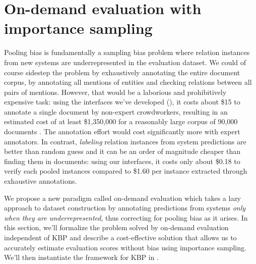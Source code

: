 \section{On-demand evaluation with importance sampling}
\label{sec:method}

Pooling bias is fundamentally a sampling bias problem where relation instances from new systems are underrepresented in the evaluation dataset.
We could of course sidestep the problem by exhaustively annotating the entire document corpus, by annotating all mentions of entities and checking relations between all pairs of mentions. However, that would be a laborious and prohibitively expensive task:
using the interfaces we've developed (), it costs about \$15 to annotate a single document by non-expert crowdworkers, resulting in an estimated cost of at least \$1,350,000 for a reasonably large corpus of 90,000 documents \citep{dang2016kbp}.
The annotation effort would cost significantly more with expert annotators.
In contrast, \textit{labeling} 
relation instances from system predictions are better than random guess and it
can be an order of magnitude cheaper than finding them in documents: using our interfaces, it costs only about \$0.18 to verify each pooled instances compared to \$1.60 per instance extracted through exhaustive annotations.

We propose a new paradigm called on-demand evaluation which takes a lazy approach to dataset construction by annotating predictions from systems \textit{only when they are underrepresented}, thus correcting for pooling bias as it arises.
In this section, we'll formalize the problem solved by on-demand evaluation independent of KBP and describe a cost-effective solution that allows us to accurately estimate evaluation scores
without bias using importance sampling.
We'll then instantiate the framework for KBP in .

